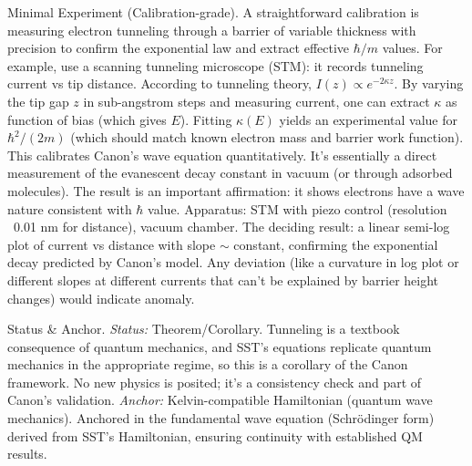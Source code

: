 \documentclass[11pt]{article}
\begin{document}
Minimal Experiment (Calibration-grade). A straightforward calibration is measuring electron tunneling through a barrier of variable thickness with precision to confirm the exponential law and extract effective $\hbar/m$ values. For example, use a scanning tunneling microscope (STM): it records tunneling current vs tip distance. According to tunneling theory, $I(z) \propto e^{-2\kappa z}$. By varying the tip gap $z$ in sub-angstrom steps and measuring current, one can extract $\kappa$ as function of bias (which gives $E$). Fitting $\kappa(E)$ yields an experimental value for $\hbar^2/(2m)$ (which should match known electron mass and barrier work function). This calibrates Canon’s wave equation quantitatively. It’s essentially a direct measurement of the evanescent decay constant in vacuum (or through adsorbed molecules). The result is an important affirmation: it shows electrons have a wave nature consistent with $\hbar$ value. Apparatus: STM with piezo control (resolution ~0.01 nm for distance), vacuum chamber. The deciding result: a linear semi-log plot of current vs distance with slope $\sim$ constant, confirming the exponential decay predicted by Canon’s model. Any deviation (like a curvature in log plot or different slopes at different currents that can't be explained by barrier height changes) would indicate anomaly.


Status & Anchor. \textit{Status:} Theorem/Corollary. Tunneling is a textbook consequence of quantum mechanics, and SST’s equations replicate quantum mechanics in the appropriate regime, so this is a corollary of the Canon framework. No new physics is posited; it’s a consistency check and part of Canon’s validation. \textit{Anchor:} Kelvin-compatible Hamiltonian (quantum wave mechanics). Anchored in the fundamental wave equation (Schrödinger form) derived from SST’s Hamiltonian, ensuring continuity with established QM results.
\end{document}
